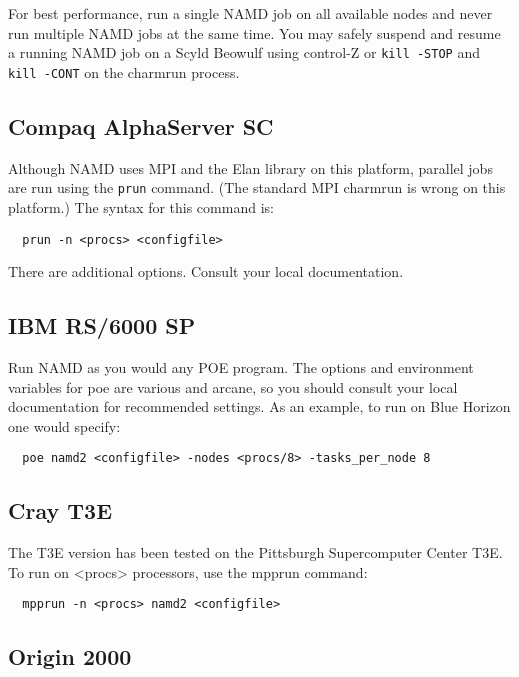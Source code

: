 For best performance, run a single NAMD job on all available nodes and
never run multiple NAMD jobs at the same time.  You may safely suspend
and resume a running NAMD job on a Scyld Beowulf using control-Z or
\verb#kill -STOP# and \verb#kill -CONT# on the charmrun process.

\subsection{Compaq AlphaServer SC}

Although NAMD uses MPI and the Elan library on this platform, parallel
jobs are run using the \verb#prun# command.  (The standard MPI charmrun is
wrong on this platform.)  The syntax for this command is:

\begin{verbatim}
  prun -n <procs> <configfile>
\end{verbatim}

There are additional options.  Consult your local documentation.

\subsection{IBM RS/6000 SP}

Run NAMD as you would any POE program.  The options and environment
variables for poe are various and arcane, so you should consult your
local documentation for recommended settings.  As an example, to run
on Blue Horizon one would specify:

\begin{verbatim}
  poe namd2 <configfile> -nodes <procs/8> -tasks_per_node 8
\end{verbatim}

\subsection{Cray T3E}

The T3E version has been tested on the Pittsburgh Supercomputer Center
T3E.  To run on <procs> processors, use the mpprun command:

\begin{verbatim}
  mpprun -n <procs> namd2 <configfile>
\end{verbatim}

\subsection{Origin 2000}

